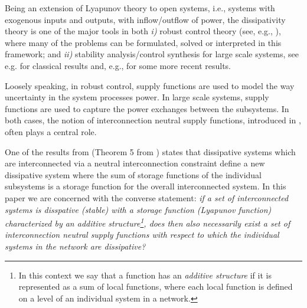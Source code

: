 \documentclass[11pt,a4paper,oneside,DIV=12,headings=small]{scrartcl}
\theoremstyle{plain}
\begin{document}
Being an extension of Lyapunov theory to open systems, i.e., systems with exogenous inputs and outputs, with inflow/outflow of power, the dissipativity theory is one of the major tools in both \emph{i)} robust control theory (see, e.g., \cite{DullerudPaganini, SchererWeiland}), where many of the problems can be formulated, solved or interpreted in this framework; and \emph{ii)} stability analysis/control synthesis for large scale systems, see e.g. \cite{MoylanHill} for classical results and, e.g., \cite{DAndreaDullerud, Langbort} for some more recent results.

Loosely speaking, in robust control, supply functions are used to model the way uncertainty in the system processes power. In large scale systems, supply functions are used to capture the power exchanges between the subsystems. In both cases, the notion of interconnection neutral supply functions, introduced in \cite{Willems_1}, often plays a central role. 


%

One of the results from \cite{Willems_1} (Theorem 5 from \cite{Willems_1}) states that dissipative systems which are interconnected via a neutral interconnection constraint define a new dissipative system where the sum of storage functions of the individual subsystems is a storage function for the overall interconnected system. 
In this paper we are concerned with the converse statement: \emph{if a set of interconnected systems is disspative (stable) with a storage function (Lyapunov function) characterized by an additive structure\footnote{In this context we say that a function has an \emph{additive structure} if it is represented as a sum of local functions, where each local function is defined on a level of an individual system in a network.}, does then also necessarily exist a set of interconnection neutral supply functions with respect to which the individual systems in the network are dissipative?}
\end{document}
